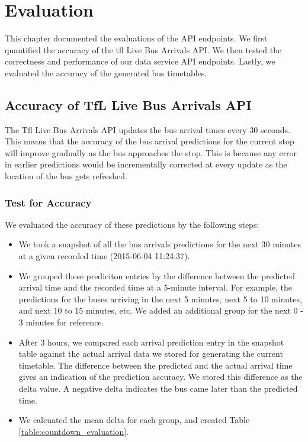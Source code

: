 \chapter{Evaluation}
\label{ch:evaluation}
\par This chapter documented the evaluations of the API endpoints. We first quantified the accuracy of the \acrshort{tfl} Live Bus Arrivals API. We then tested the correctness and performance of our data service API endpoints. Lastly, we evaluated the accuracy of the generated bus timetables.

\section{Accuracy of TfL Live Bus Arrivals API}
\label{sec:tfl_stream_accuracy}
\par The Tfl Live Bus Arrivals API updates the bus arrival times every 30 seconds. This means that the accuracy of the bus arrival predictions for the current stop will improve gradually as the bus approaches the stop. This is because any error in earlier predictions would be incrementally corrected at every update as the location of the bus gets refreshed.

\subsection{Test for Accuracy}
\par We evaluated the accuracy of these predictions by the following steps:

\begin{itemize}
  \item We took a snapshot of all the bus arrivals predictions for the next 30 minutes at a given recorded time (2015-06-04 11:24:37).
  \item We grouped these prediciton entries by the difference between the predicted arrival time and the recorded time at a 5-minute interval. For example, the predictions for the buses arriving in the next 5 minutes, next 5 to 10 minutes, and next 10 to 15 minutes, etc. We added an additional group for the next 0 - 3 minutes for reference.
  \item After 3 hours, we compared each arrival prediction entry in the snapshot table against the actual arrival data we stored for generating the current timetable. The difference between the predicted and the actual arrival time gives an indication of the prediction accuracy. We stored this difference as the delta value. A negative delta indicates the bus came later than the predicted time.
  \item We calcuated the mean delta for each group, and created Table \ref{table:countdown_evaluation}.
\end{itemize}

